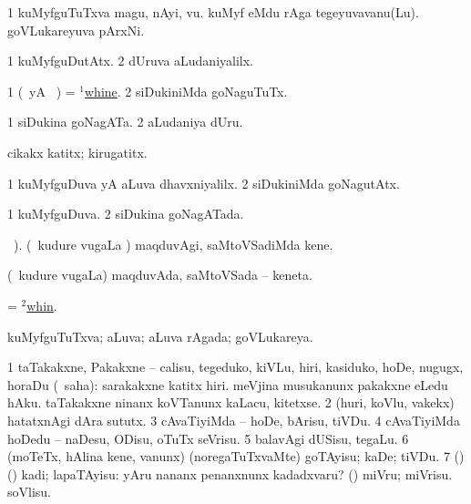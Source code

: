 \bentry
{} 
\gl{\nA}
\expl{}
\bmng
\bnum
\num{1} kuMyfguTuTxva magu, nAyi, \mo vu. 
\banum
{} kuMyf eMdu rAga tegeyuvavanu(Lu). 
 goVLukareyuva pArxNi. 
\eanum
\numie
\enum
\emng
\eentry

\bentry
{} 
\gl{\kirxvi}
\expl{}
\bmng
\bnum
\num{1} kuMyfguDutAtx. 
\num{2} dUruva aLudaniyalilx. 
\enum
\emng
\eentry

\bentry
{} 
\gl{\akirx}
\expl{}
\bmng
\bnum
\num{1} (\pArxM\ yA \AseTxrXV\ \parx) = \hyperlink{whine(1)}{$^1$whine}. 
\num{2} siDukiniMda goNaguTuTx. 
\enum
\emng
\eentry

\bentry
{} 
\gl{\nA}
\expl{}
\bmng
\bnum
\num{1} siDukina goNagATa. 
\num{2} aLudaniya dUru. 
\enum
\emng
\eentry

\bentry
{} 
\gl{\nA}
\expl{}
\bmng
cikakx katitx; kirugatitx. 
\emng
\eentry

\bentry
{} 
\gl{\kirxvi}
\expl{}
\bmng
\bnum
\num{1} kuMyfguDuva yA aLuva dhavxniyalilx. 
\num{2} siDukiniMda goNagutAtx. 
\enum
\emng
\eentry

\bentry
{} 
\gl{\gu}
\expl{}
\bmng
\bnum
\num{1} kuMyfguDuva. 
\num{2} siDukina goNagATada. 
\enum
\emng
\eentry

\bentry
{} 
\gl{\akirx}
 \BUkaq\ ).\bmng
(\sA\ kudure \mo vugaLa \vi) maqduvAgi, saMtoVSadiMda kene. 
\emng
\eentry

\bentry
{} 
\gl{\nA}
\bmng
(\sA\ kudure \mo vugaLa) maqduvAda, saMtoVSada -- keneta. 
\emng
\eentry

\bentry
{} 
\gl{\nA}
\expl{}
\bmng
= \hyperlink{whin(2)}{$^2$whin}. 
\emng
\eentry

\bentry
{} 
\gl{\gu}
\bmng
kuMyfguTuTxva; aLuva; aLuva rAgada; goVLukareya. 
\emng
\eentry

\bentry
{} 
\gl{\sakirx}
\bmng
\bnum
\num{1} taTakakxne, Pakakxne -- calisu, tegeduko, kiVLu, hiri, kasiduko, hoDe, nugugx, horaDu (\akirx\ saha):  sarakakxne katitx hiri.  meVjina musukanunx pakakxne eLedu hAku.  taTakakxne ninanx koVTanunx kaLacu, kitetxse. 
\num{2} (huri, koVlu, \mo vakekx) hatatxnAgi dAra sututx. 
\num{3} cAvaTiyiMda -- hoDe, bArisu, tiVDu. 
\num{4} cAvaTiyiMda hoDedu -- naDesu, ODisu, oTuTx seVrisu. 
\num{5} balavAgi dUSisu, tegaLu. 
\num{6} (moTeTx, hAlina kene, \mo vanunx) (noregaTuTxvaMte) goTAyisu; kaDe; tiVDu. 
\num{7} (\birx) (\ashi) kadi; lapaTAyisu:  yAru nananx penanxnunx kadadxvaru? 
 (\ashi) 
\banum
{} miVru; miVrisu. 
 soVlisu. 
\eanum
\numie
\enum
\emng

